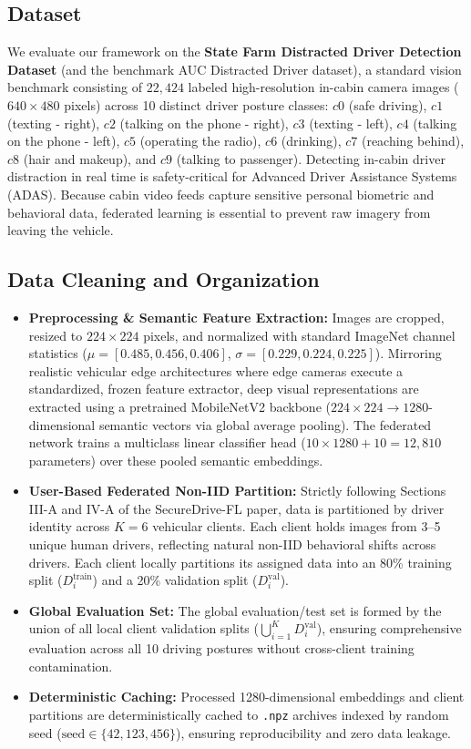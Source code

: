 \documentclass[acmtog,nonacm]{acmart}
\begin{document}
\subsection{Dataset}
We evaluate our framework on the \textbf{State Farm Distracted Driver Detection Dataset} (and the benchmark AUC Distracted Driver dataset), a standard vision benchmark consisting of $22{,}424$ labeled high-resolution in-cabin camera images ($640 \times 480$ pixels) across 10 distinct driver posture classes:
$c0$ (safe driving), $c1$ (texting - right), $c2$ (talking on the phone - right), $c3$ (texting - left), $c4$ (talking on the phone - left), $c5$ (operating the radio), $c6$ (drinking), $c7$ (reaching behind), $c8$ (hair and makeup), and $c9$ (talking to passenger).
Detecting in-cabin driver distraction in real time is safety-critical for Advanced Driver Assistance Systems (ADAS). Because cabin video feeds capture sensitive personal biometric and behavioral data, federated learning is essential to prevent raw imagery from leaving the vehicle.

\subsection{Data Cleaning and Organization}
\begin{itemize}
    \item \textbf{Preprocessing \& Semantic Feature Extraction:} Images are cropped, resized to $224 \times 224$ pixels, and normalized with standard ImageNet channel statistics ($\mu = [0.485, 0.456, 0.406]$, $\sigma = [0.229, 0.224, 0.225]$). Mirroring realistic vehicular edge architectures where edge cameras execute a standardized, frozen feature extractor, deep visual representations are extracted using a pretrained MobileNetV2 backbone ($224 \times 224 \to 1280$-dimensional semantic vectors via global average pooling). The federated network trains a multiclass linear classifier head ($10 \times 1280 + 10 = 12{,}810$ parameters) over these pooled semantic embeddings.
    \item \textbf{User-Based Federated Non-IID Partition:} Strictly following Sections III-A and IV-A of the SecureDrive-FL paper, data is partitioned by driver identity across $K = 6$ vehicular clients. Each client holds images from 3--5 unique human drivers, reflecting natural non-IID behavioral shifts across drivers. Each client locally partitions its assigned data into an 80\% training split ($D_i^{\text{train}}$) and a 20\% validation split ($D_i^{\text{val}}$).
    \item \textbf{Global Evaluation Set:} The global evaluation/test set is formed by the union of all local client validation splits ($\bigcup_{i=1}^K D_i^{\text{val}}$), ensuring comprehensive evaluation across all 10 driving postures without cross-client training contamination.
    \item \textbf{Deterministic Caching:} Processed 1280-dimensional embeddings and client partitions are deterministically cached to \texttt{.npz} archives indexed by random seed ($\text{seed} \in \{42, 123, 456\}$), ensuring reproducibility and zero data leakage.
\end{itemize}
\end{document}
